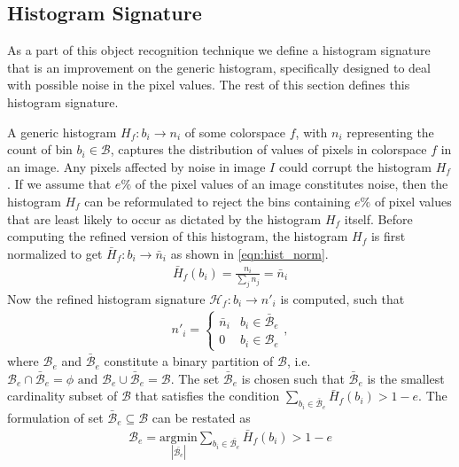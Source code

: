 \documentclass {udthesis}
\begin{document}
\subsection{Histogram Signature}
\label{sec:hist_signature}

As a part of this object recognition technique we define a histogram signature that is an improvement on the generic histogram, specifically designed to deal with possible noise in the pixel values. The rest of this section defines this histogram signature.

A generic histogram $H_f:b_i\to n_i$ of some colorspace $f$, with $n_i$ representing the count of bin $b_i \in \mathcal{B}$, captures the distribution of values of pixels in colorspace $f$ in an image. Any pixels affected by noise in image $I$ could corrupt the histogram $H_f$. If we assume that $e\%$ of the pixel values of an image constitutes noise, then the histogram $H_f$ can be reformulated to reject the bins containing $e\%$ of pixel values that are least likely to occur as dictated by the histogram $H_f$ itself. Before computing the refined version of this histogram, the histogram $H_f$ is first normalized to get $\bar{H}_f:b_i\to \bar{n}_i$ as shown in \eqref{eqn:hist_norm}.
%
\begin{align}	\label{eqn:hist_norm}
 \bar{H}_f(b_i)=\frac{n_i}{\sum_{j}n_j}=\bar{n}_i
\end{align}
Now the refined histogram signature $\mathcal{H}_f:b_i\to n'_i$ is computed, such that
\begin{align}
  n'_i = 
  \begin{cases}
     \bar{n}_i & b_i \in \bar{\mathcal{B}}_e\\
     0	&	b_i \in \mathcal{B}_e
  \end{cases},
\end{align}
%
where $\mathcal{B}_e$ and $\bar{\mathcal{B}}_e$ constitute a binary partition of $\mathcal{B}$, 
i.e. $\mathcal{B}_e \cap \bar{\mathcal{B}}_e = \phi \text{ and } 
\mathcal{B}_e \cup \bar{\mathcal{B}}_e = \mathcal{B}$. 
The set $\bar{\mathcal{B}}_e$ is chosen such that 
$\bar{\mathcal{B}}_e$ is the smallest cardinality subset of 
$\mathcal{B}$ that satisfies the condition $\sum_{b_i \in \bar{\mathcal{B}}_e} \bar{H}_f(b_i) > 1-e$. 
The formulation of set $\bar{\mathcal{B}}_e\subseteq\mathcal{B}$ can be restated as
\begin{align}
 \mathcal{{B}}_e=\underset{|\bar{\mathcal{B}_e}|} {\mathrm{argmin}} \sum_{b_i \in \bar{\mathcal{B}_e}} \bar{H}_f(b_i) > 1-e
\end{align}
\end{document}
